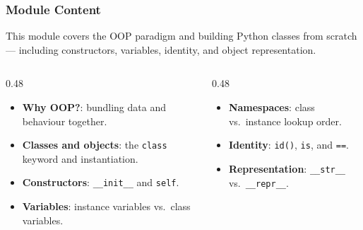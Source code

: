 \documentclass[aspectratio=169,10pt]{beamer}
\newcommand{\keyword}[1]{\textcolor{PrimaryBlue}{\textbf{#1}}}
\newcommand{\codeword}[1]{\texttt{#1}}
\begin{document}
\begin{frame}[fragile]
\frametitle{Module Content}
\small
This module covers the OOP paradigm and building Python classes from scratch — including constructors, variables, identity, and object representation.

\vspace{0.16cm}
\begin{columns}[T,totalwidth=0.96\textwidth]
\begin{column}{0.48\textwidth}
\begin{itemize}\setlength\itemsep{0.08cm}
  \item \keyword{Why OOP?}: bundling data and behaviour together.
  \item \keyword{Classes and objects}: the \codeword{class} keyword and instantiation.
  \item \keyword{Constructors}: \codeword{\_\_init\_\_} and \codeword{self}.
  \item \keyword{Variables}: instance variables vs.\ class variables.
\end{itemize}
\end{column}
\begin{column}{0.48\textwidth}
\begin{itemize}\setlength\itemsep{0.08cm}
  \item \keyword{Namespaces}: class vs.\ instance lookup order.
  \item \keyword{Identity}: \codeword{id()}, \codeword{is}, and \codeword{==}.
  \item \keyword{Representation}: \codeword{\_\_str\_\_} vs.\ \codeword{\_\_repr\_\_}.
\end{itemize}
\end{column}
\end{columns}
\end{frame}
\end{document}
